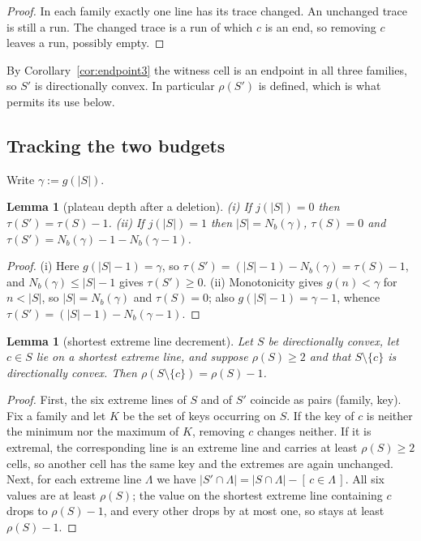 \documentclass[11pt]{article}
\theoremstyle{plain}
\newtheorem{lemma}[theorem]{Lemma}
\theoremstyle{definition}
\theoremstyle{remark}
\newcommand{\sm}{\setminus}
\begin{document}
\begin{proof}
In each family exactly one line has its trace changed. An unchanged trace is still a run. The
changed trace is a run of which \(c\) is an end, so removing \(c\) leaves a run, possibly
empty.
\end{proof}

By Corollary~\ref{cor:endpoint3} the witness cell is an endpoint in all three families, so
\(S'\) is directionally convex. In particular \(\rho(S')\) is defined, which is what permits
its use below.

\subsection{Tracking the two budgets}\label{sec:13.2}

Write \(\gamma:=g(|S|)\).

\begin{lemma}[plateau depth after a deletion]\label{lem:taudiff}
\textup{(i)} If \(j(|S|)=0\) then \(\tau(S')=\tau(S)-1\).
\textup{(ii)} If \(j(|S|)=1\) then \(|S|=N_{b}(\gamma)\), \(\tau(S)=0\) and
\(\tau(S')=N_{b}(\gamma)-1-N_{b}(\gamma-1)\).
\end{lemma}

\begin{proof}
(i) Here \(g(|S|-1)=\gamma\), so \(\tau(S')=(|S|-1)-N_{b}(\gamma)=\tau(S)-1\), and
\(N_{b}(\gamma)\le|S|-1\) gives \(\tau(S')\ge0\).
(ii) Monotonicity gives \(g(n)<\gamma\) for \(n<|S|\), so \(|S|=N_{b}(\gamma)\) and
\(\tau(S)=0\); also \(g(|S|-1)=\gamma-1\), whence
\(\tau(S')=(|S|-1)-N_{b}(\gamma-1)\).
\end{proof}

\begin{lemma}[shortest extreme line decrement]\label{lem:decr}
Let \(S\) be directionally convex, let \(c\in S\) lie on a shortest extreme line, and suppose
\(\rho(S)\ge2\) and that \(S\sm\{c\}\) is directionally convex. Then
\(\rho(S\sm\{c\})=\rho(S)-1\).
\end{lemma}

\begin{proof}
First, the six extreme lines of \(S\) and of \(S'\) coincide as pairs (family, key). Fix a
family and let \(K\) be the set of keys occurring on \(S\). If the key of \(c\) is neither
the minimum nor the maximum of \(K\), removing \(c\) changes neither. If it is extremal, the
corresponding line is an extreme line and carries at least \(\rho(S)\ge2\) cells, so another
cell has the same key and the extremes are again unchanged. Next, for each extreme line
\(\Lambda\) we have \(|S'\cap\Lambda|=|S\cap\Lambda|-[\,c\in\Lambda\,]\). All six values are
at least \(\rho(S)\); the value on the shortest extreme line containing \(c\) drops to
\(\rho(S)-1\), and every other drops by at most one, so stays at least \(\rho(S)-1\).
\end{proof}
\end{document}
